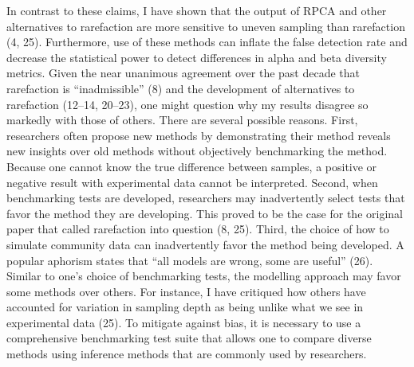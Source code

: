 \documentclass[
  11pt,
]{article}
\begin{document}
In contrast to these claims, I have shown that the output of RPCA and
other alternatives to rarefaction are more sensitive to uneven sampling
than rarefaction (4, 25). Furthermore, use of these methods can inflate
the false detection rate and decrease the statistical power to detect
differences in alpha and beta diversity metrics. Given the near
unanimous agreement over the past decade that rarefaction is
``inadmissible'' (8) and the development of alternatives to rarefaction
(12--14, 20--23), one might question why my results disagree so markedly
with those of others. There are several possible reasons. First,
researchers often propose new methods by demonstrating their method
reveals new insights over old methods without objectively benchmarking
the method. Because one cannot know the true difference between samples,
a positive or negative result with experimental data cannot be
interpreted. Second, when benchmarking tests are developed, researchers
may inadvertently select tests that favor the method they are
developing. This proved to be the case for the original paper that
called rarefaction into question (8, 25). Third, the choice of how to
simulate community data can inadvertently favor the method being
developed. A popular aphorism states that ``all models are wrong, some
are useful'' (26). Similar to one's choice of benchmarking tests, the
modelling approach may favor some methods over others. For instance, I
have critiqued how others have accounted for variation in sampling depth
as being unlike what we see in experimental data (25). To mitigate
against bias, it is necessary to use a comprehensive benchmarking test
suite that allows one to compare diverse methods using inference methods
that are commonly used by researchers.
\end{document}
